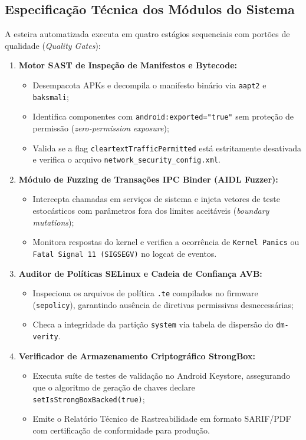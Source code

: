 \subsection{Especificação Técnica dos Módulos do Sistema}
A esteira automatizada executa em quatro estágios sequenciais com portões de qualidade (\textit{Quality Gates}):
\begin{enumerate}
    \item \textbf{Motor SAST de Inspeção de Manifestos e Bytecode:}
    \begin{itemize}
        \item Desempacota APKs e decompila o manifesto binário via \texttt{aapt2} e \texttt{baksmali};
        \item Identifica componentes com \texttt{android:exported="true"} sem proteção de permissão (\textit{zero-permission exposure});
        \item Valida se a flag \texttt{cleartextTrafficPermitted} está estritamente desativada e verifica o arquivo \texttt{network\_security\_config.xml}.
    \end{itemize}
    \item \textbf{Módulo de Fuzzing de Transações IPC Binder (AIDL Fuzzer):}
    \begin{itemize}
        \item Intercepta chamadas em serviços de sistema e injeta vetores de teste estocásticos com parâmetros fora dos limites aceitáveis (\textit{boundary mutations});
        \item Monitora respostas do kernel e verifica a ocorrência de \texttt{Kernel Panics} ou \texttt{Fatal Signal 11 (SIGSEGV)} no logcat de eventos.
    \end{itemize}
    \item \textbf{Auditor de Políticas SELinux e Cadeia de Confiança AVB:}
    \begin{itemize}
        \item Inspeciona os arquivos de política \texttt{.te} compilados no firmware (\texttt{sepolicy}), garantindo ausência de diretivas permissivas desnecessárias;
        \item Checa a integridade da partição \texttt{system} via tabela de dispersão do \texttt{dm-verity}.
    \end{itemize}
    \item \textbf{Verificador de Armazenamento Criptográfico StrongBox:}
    \begin{itemize}
        \item Executa suíte de testes de validação no Android Keystore, assegurando que o algoritmo de geração de chaves declare \texttt{setIsStrongBoxBacked(true)};
        \item Emite o Relatório Técnico de Rastreabilidade em formato SARIF/PDF com certificação de conformidade para produção.
    \end{itemize}
\end{enumerate}
